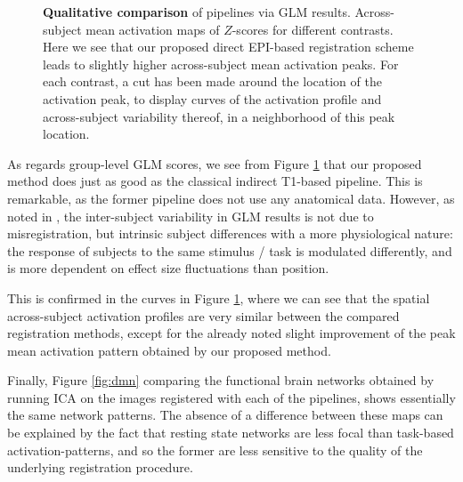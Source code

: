 \begin{figure}[!htbp]
\caption{\textbf{Qualitative comparison} of pipelines via GLM results.
  Across-subject mean activation maps of $Z$-scores for different contrasts.
  Here we see that our proposed direct EPI-based registration scheme leads to slightly higher across-subject mean activation peaks.  For each contrast, a cut has been made around the location of the activation peak, to display curves of the activation profile and across-subject variability thereof, in a neighborhood of this peak location.
}
\label{fig:zmaps}
\end{figure}

As regards group-level GLM scores, we see from Figure \ref{fig:zmaps}
that our proposed method does just as good as the classical indirect
T1-based pipeline. This is remarkable, as the former pipeline does not
use any anatomical data.
However, as noted in \cite{thirion2007analysis,pmid22425669}, the
inter-subject variability in GLM results is not due to
misregistration, but intrinsic subject differences with a more
physiological nature: the response of subjects to the same stimulus /
task is modulated differently, and is more dependent on effect size fluctuations than position. 

%
This
is confirmed in the curves in Figure \ref{fig:zmaps}, where we can see that the spatial across-subject activation profiles
are very similar between the compared registration methods, except for the already noted
slight improvement of the peak mean activation pattern obtained by our proposed method.

Finally, Figure \ref{fig:dmn} comparing the functional brain networks obtained by running
ICA on the images registered with each of the pipelines, shows essentially the same network
patterns. The absence of a difference between these maps can be explained by the fact that
resting state networks are less focal than task-based activation-patterns, and
so the former are less sensitive to the quality of the underlying registration procedure.

